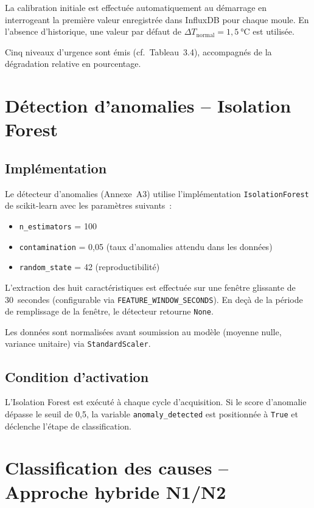 La calibration initiale est effectuée automatiquement au démarrage en interrogeant la première valeur enregistrée dans InfluxDB pour chaque moule. En l'absence d'historique, une valeur par défaut de \(\Delta T_{\text{normal}} = 1,5~\si{\celsius}\) est utilisée.

Cinq niveaux d'urgence sont émis (cf.~Tableau~3.4), accompagnés de la dégradation relative en pourcentage.

\section{Détection d'anomalies -- Isolation Forest}

\subsection{Implémentation}

Le détecteur d'anomalies (Annexe~A3) utilise l'implémentation \texttt{IsolationForest} de scikit-learn avec les paramètres suivants~:

\begin{itemize}
  \item \texttt{n\_estimators} = 100
  \item \texttt{contamination} = 0,05 (taux d'anomalies attendu dans les données)
  \item \texttt{random\_state} = 42 (reproductibilité)
\end{itemize}

L'extraction des huit caractéristiques est effectuée sur une fenêtre glissante de 30~secondes (configurable via \texttt{FEATURE\_WINDOW\_SECONDS}). En deçà de la période de remplissage de la fenêtre, le détecteur retourne \texttt{None}.

Les données sont normalisées avant soumission au modèle (moyenne nulle, variance unitaire) via \texttt{StandardScaler}.

\subsection{Condition d'activation}

L'Isolation Forest est exécuté à chaque cycle d'acquisition. Si le score d'anomalie dépasse le seuil de 0,5, la variable \texttt{anomaly\_detected} est positionnée à \texttt{True} et déclenche l'étape de classification.

\section{Classification des causes -- Approche hybride N1/N2}

